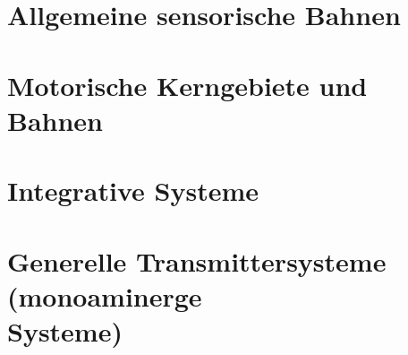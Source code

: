 \documentclass[12pt,a4paper,pdftex]{article}
\begin{document}

\newpage
\section{Allgemeine sensorische Bahnen}\label{sec:sensorische_Bahnen}



\newpage

\newpage




\newpage
\section{Motorische Kerngebiete und Bahnen} \label{sec:Motorik}











\newpage
\section{Integrative Systeme} \label{sec:integrative_systeme}


\newpage





\newpage
\section[Generelle Transmittersysteme (monoaminerge Systeme)]{Generelle Transmittersysteme (monoaminerge \\Systeme)}
\label{sec:transmittersysteme}
\end{document}
